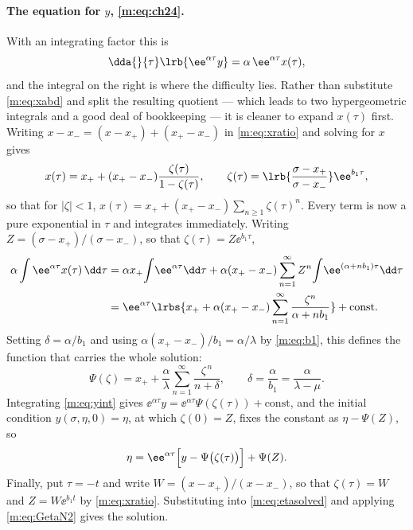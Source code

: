 \paragraph{The equation for $y$, \eqref{m:eq:ch24}.}
With an integrating factor this is
\begin{equation}
\label{m:eq:yint}
\dda{}{\tau}\lrb{\ee^{\alpha\tau}y} = \alpha\,\ee^{\alpha\tau}x(\tau),
\end{equation}
and the integral on the right is where the difficulty lies. Rather than substitute
\cref{m:eq:xabd} and split the resulting quotient --- which leads to two
hypergeometric integrals and a good deal of bookkeeping --- it is cleaner to expand
$x(\tau)$ first. Writing $x-x_- = (x-x_+)+(x_+-x_-)$ in \cref{m:eq:xratio} and
solving for $x$ gives
\begin{equation}
\label{m:eq:xgeom}
x(\tau) = x_+ + (x_+-x_-)\frac{\zeta(\tau)}{1-\zeta(\tau)},
\qquad
\zeta(\tau) = \lrb{\frac{\sigma-x_+}{\sigma-x_-}}\ee^{b_1\tau},
\end{equation}
so that for $|\zeta|<1$,
$x(\tau) = x_+ + (x_+-x_-)\sum_{n\ge1}\zeta(\tau)^n$. Every term is now a pure
exponential in $\tau$ and integrates immediately. Writing
$Z = (\sigma-x_+)/(\sigma-x_-)$, so that $\zeta(\tau)=Z\ee^{b_1\tau}$,
\begin{align*}
\alpha\int\ee^{\alpha\tau}x(\tau)\,\dd\tau
&= \alpha x_+\!\int\!\ee^{\alpha\tau}\dd\tau
 + \alpha(x_+-x_-)\sum_{n=1}^{\infty}Z^n\!\int\!\ee^{(\alpha+nb_1)\tau}\dd\tau\\
&= \ee^{\alpha\tau}\lrbs{x_+ + \alpha(x_+-x_-)\sum_{n=1}^{\infty}\frac{\zeta^n}{\alpha+nb_1}}
 + \text{const} .
\end{align*}
Setting $\delta = \alpha/b_1$ and using $\alpha(x_+-x_-)/b_1 = \alpha/\lambda$ by
\cref{m:eq:b1}, this defines the function that carries the whole solution:
\begin{equation}
\label{m:eq:Psidef}
\Psi(\zeta) = x_+ + \frac{\alpha}{\lambda}\sum_{n=1}^{\infty}\frac{\zeta^{\,n}}{n+\delta},
\qquad
\delta = \frac{\alpha}{b_1} = \frac{\alpha}{\lambda-\mu} .
\end{equation}
Integrating \cref{m:eq:yint} gives
$\ee^{\alpha\tau}y = \ee^{\alpha\tau}\Psi(\zeta(\tau))+\text{const}$, and the
initial condition $y(\sigma,\eta,0)=\eta$, at which $\zeta(0)=Z$, fixes the constant
as $\eta-\Psi(Z)$, so
\begin{equation}
\label{m:eq:etasolved}
\eta = \ee^{\alpha\tau}\Bigl[y-\Psi\bigl(\zeta(\tau)\bigr)\Bigr] + \Psi(Z) .
\end{equation}
Finally, put $\tau=-t$ and write $W = (x-x_+)/(x-x_-)$, so that $\zeta(\tau)=W$ and
$Z = W\ee^{b_1t}$ by \cref{m:eq:xratio}. Substituting into \cref{m:eq:etasolved} and
applying \cref{m:eq:GetaN2} gives the solution.

